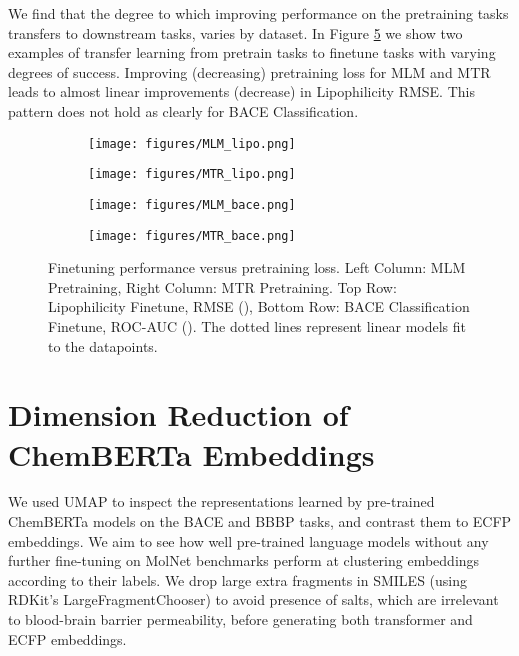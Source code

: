\documentclass{article}
\begin{document}
We find that the degree to which improving performance on the pretraining tasks transfers to downstream tasks, varies by dataset. In Figure \ref{fig:lipo and bace pt to ft} we show two examples of transfer learning from pretrain tasks to finetune tasks with varying degrees of success. Improving (decreasing) pretraining loss for MLM and MTR leads to almost linear improvements (decrease) in Lipophilicity RMSE. This pattern does not hold as clearly for BACE Classification.



\begin{figure}
     \centering
     \begin{subfigure}[b]{0.33\textwidth}
         \centering
         \texttt{[image: figures/MLM\_lipo.png]}
         \label{fig:lipo mlm}
     \end{subfigure}
     \begin{subfigure}[b]{0.33\textwidth}
         \centering
         \texttt{[image: figures/MTR\_lipo.png]}
         \label{fig:lipo mtr}
     \end{subfigure}
     \begin{subfigure}[b]{0.33\textwidth}
         \centering
         \texttt{[image: figures/MLM\_bace.png]}
         \label{fig:bace mlm}
     \end{subfigure}
     \begin{subfigure}[b]{0.33\textwidth}
         \centering
         \texttt{[image: figures/MTR\_bace.png]}
         \label{fig:bace mtr}
     \end{subfigure}
        \caption{Finetuning performance versus pretraining loss. Left Column: MLM Pretraining, Right Column: MTR Pretraining. Top Row: Lipophilicity Finetune, RMSE (), Bottom Row: BACE Classification Finetune, ROC-AUC (). The dotted lines represent linear models fit to the datapoints.}
        \label{fig:lipo and bace pt to ft}
\end{figure}

\section{Dimension Reduction of ChemBERTa Embeddings}

We used UMAP \cite{umap} to inspect the representations learned by pre-trained ChemBERTa models on the BACE and BBBP tasks, and contrast them to ECFP embeddings. We aim to see how well pre-trained language models without any further fine-tuning on MolNet benchmarks perform at clustering embeddings according to their labels. We drop large extra fragments in SMILES (using RDKit's LargeFragmentChooser) to avoid presence of salts, which are irrelevant to blood-brain barrier permeability, before generating both transformer and ECFP embeddings. 
\end{document}
